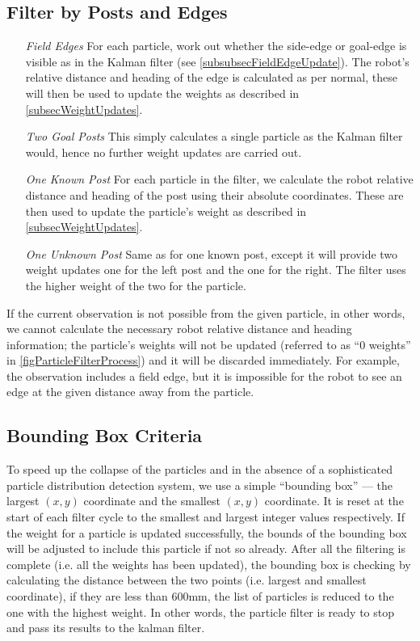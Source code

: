 \documentclass[pdftex,11pt,a4paper]{report}
\begin{document}
 \subsection{Filter by Posts and Edges}
 \begin{itemize}
   \item[\emph{Field Edges}] For each particle, work out whether the side-edge or goal-edge is visible as in the Kalman filter (see \autoref{subsubsecFieldEdgeUpdate}). The robot's relative distance and heading of the edge is calculated as per normal, these will then be used to update the weights as described in \autoref{subsecWeightUpdates}.
    \item[\emph{Two Goal Posts}] This simply calculates a single particle as the Kalman filter would, hence no further weight updates are carried out.
    \item[\emph{One Known Post}] For each particle in the filter, we calculate the robot relative distance and heading of the post using their absolute coordinates. These are then used to update the particle's weight as described in \autoref{subsecWeightUpdates}.
    \item[\emph{One Unknown Post}] Same as for one known post, except it will provide two weight updates one for the left post and the one for the right. The filter uses the higher weight of the two for the particle.
\end{itemize}
If the current observation is not possible from the given particle, in other words, we cannot calculate the necessary robot relative distance and heading information; the particle's weights will not be updated (referred to as ``0 weights'' in \autoref{figParticleFilterProcess}) and it will be discarded immediately. For example, the observation includes a field edge, but it is impossible for the robot to see an edge at the given distance away from the particle. 

 \subsection{Bounding Box Criteria} \label{subsecBoundingBox}
 To speed up the collapse of the particles and in the absence of a sophisticated particle distribution detection system, we use a simple ``bounding box'' --- the largest $(x, y)$ coordinate and the smallest $(x, y)$ coordinate. It is reset at the start of each filter cycle to the smallest and largest integer values respectively. If the weight for a particle is updated successfully, the bounds of the bounding box will be adjusted to include this particle if not so already. After all the filtering is complete (i.e. all the weights has been updated), the bounding box is checking by calculating the distance between the two points (i.e. largest and smallest coordinate), if they are less than 600mm, the list of particles is reduced to the one with the highest weight. In other words, the particle filter is ready to stop and pass its results to the kalman filter.
 
\end{document}
